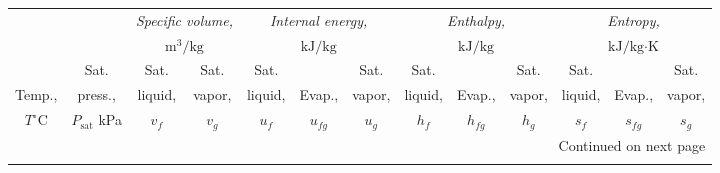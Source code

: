 \documentclass[12pt,a3paper]{article}
\begin{document}
\begin{enumerate}
\begin{center}
\small
\begin{longtable}{c c c c c c c c c c c c c}
\toprule\toprule
& & \multicolumn{2}{c}{\textit{Specific volume,}} & \multicolumn{3}{c}{\textit{Internal energy,}} & \multicolumn{3}{c}{\textit{Enthalpy,}} & \multicolumn{3}{c}{\textit{Entropy,}} \\
& & \multicolumn{2}{c}{$\text{m}^3\text{/kg}$} & \multicolumn{3}{c}{$\text{kJ/kg}$} & \multicolumn{3}{c}{$\text{kJ/kg}$} & \multicolumn{3}{c}{$\text{kJ/kg}\cdot\text{K}$} \\
\cmidrule(lr){3-4} \cmidrule(lr){5-7} \cmidrule(lr){8-10} \cmidrule(lr){11-13}
& Sat. & Sat. & Sat. & Sat. & & Sat. & Sat. & & Sat. & Sat. & & Sat. \\
Temp., & press., & liquid, & vapor, & liquid, & Evap., & vapor, & liquid, & Evap., & vapor, & liquid, & Evap., & vapor, \\
$T^\circ\text{C}$ & $P_{\text{sat}}$ kPa & $v_f$ & $v_g$ & $u_f$ & $u_{fg}$ & $u_g$ & $h_f$ & $h_{fg}$ & $h_g$ & $s_f$ & $s_{fg}$ & $s_g$ \\
\midrule
\endhead

\midrule
\multicolumn{13}{r}{{Continued on next page}} \\
\bottomrule
\endfoot

\bottomrule\bottomrule
\endlastfoot


\end{longtable}
\end{center}
\end{enumerate}
\end{document}
